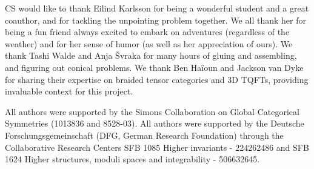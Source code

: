 \documentclass[10pt, reqno, twoside
, final
]{amsart}
\numberwithin{equation}{subsection}%
\theoremstyle{definition}
\theoremstyle{definition}
\theoremstyle{definition}
\theoremstyle{definition}
\theoremstyle{definition}
\theoremstyle{definition}
\theoremstyle{definition}
\theoremstyle{definition}
\theoremstyle{definition}
\theoremstyle{plain}
\theoremstyle{definition}
\theoremstyle{plain}
\theoremstyle{definition}
\theoremstyle{plain}
\theoremstyle{definition}
\theoremstyle{definition}
\theoremstyle{plain}
\theoremstyle{plain}
\theoremstyle{definition}
\theoremstyle{plain}
\theoremstyle{plain}
\theoremstyle{plain}
\begin{document}
CS would like to thank Eilind Karlsson for being a wonderful student and a great coauthor, and for tackling the unpointing problem together.
We all thank her for being a fun friend always excited to embark on adventures (regardless of the weather) and for her sense of humor (as well as her appreciation of ours).
We thank Tashi Walde and Anja \v{S}vraka for many hours of gluing and assembling, and figuring out conical problems. We thank Ben Ha\"{i}oun and Jackson van Dyke for sharing their expertise on braided tensor categories and 3D TQFTs, providing invaluable context for this project.


All authors were supported by the Simons Collaboration on Global Categorical Symmetries (1013836 and 8528-03).
All authors were supported by the Deutsche Forschungsgemeinschaft (DFG, German Research Foundation) through the Collaborative Research Centers SFB 1085 Higher invariants - 224262486 and
SFB 1624 Higher structures, moduli spaces and integrability - 506632645.
\end{document}
